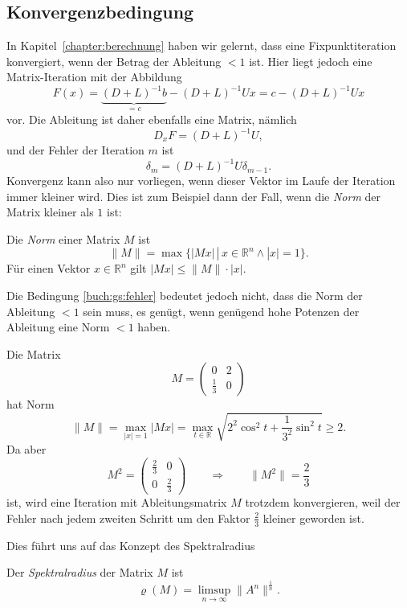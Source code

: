 %
%
\subsection{Konvergenzbedingung
\label{buch:subsection:konvergenzbedingung}}
In Kapitel~\ref{chapter:berechnung} haben wir gelernt, dass eine
Fixpunktiteration konvergiert, wenn der Betrag der Ableitung $<1$ ist.
Hier liegt jedoch eine Matrix-Iteration mit der Abbildung
\[
F(x)
=
\underbrace{(D+L)^{-1} b}_{\displaystyle=c} - (D+L)^{-1}U x
=
c - (D+L)^{-1}Ux
\]
vor.
Die Ableitung ist daher ebenfalls eine Matrix, nämlich
\[
D_xF = (D+L)^{-1}U,
\]
und der Fehler der Iteration $m$ ist
\begin{equation}
\delta_m = (D+L)^{-1}U \delta_{m-1}.
\label{buch:gs:fehler}
\end{equation}
Konvergenz kann also nur vorliegen, wenn dieser Vektor im Laufe der
Iteration immer kleiner wird.
Dies ist zum Beispiel dann der Fall, wenn die {\em Norm} der Matrix
kleiner als $1$ ist:

\begin{definition}
Die {\em Norm} einer Matrix $M$ ist
\[
\|M\|
=
\max\{|Mx|\,|\, x\in\mathbb R^n\wedge |x|=1\}.
\]
Für einen Vektor $x\in\mathbb R^n$ gilt $|Mx| \le \|M\|\cdot |x|$.
\end{definition}

Die Bedingung \eqref{buch:gs:fehler} bedeutet jedoch nicht,
dass die Norm der Ableitung $<1$ sein muss, es genügt, wenn
genügend hohe Potenzen der Ableitung eine Norm $<1$ haben.

\begin{beispiel}
Die Matrix
\[
M=\begin{pmatrix}
0&2\\
\frac13&0
\end{pmatrix}
\]
hat Norm
\[
\|M\|
=
\max_{|x|=1} |Mx| 
=
\max_{t\in\mathbb R} \sqrt{2^2\cos^2 t +\frac1{3^2}\sin^2t} \ge 2.
\]
Da aber
\[
M^2 = \begin{pmatrix}
\frac{2}{3}&0\\
0&\frac{2}{3}
\end{pmatrix}
\qquad\Rightarrow\qquad \|M^2\|=\frac23
\]
ist, wird eine Iteration mit Ableitungsmatrix $M$ trotzdem
konvergieren, weil der Fehler nach jedem zweiten Schritt um den
Faktor $\frac23$ kleiner geworden ist.
\end{beispiel}

Dies führt uns auf das Konzept des Spektralradius

\begin{definition}
Der {\em Spektralradius} der Matrix $M$ ist
\[
\varrho(M)
=
\limsup_{n\to\infty} \|A^n\|^\frac1n.
\]
\end{definition}

